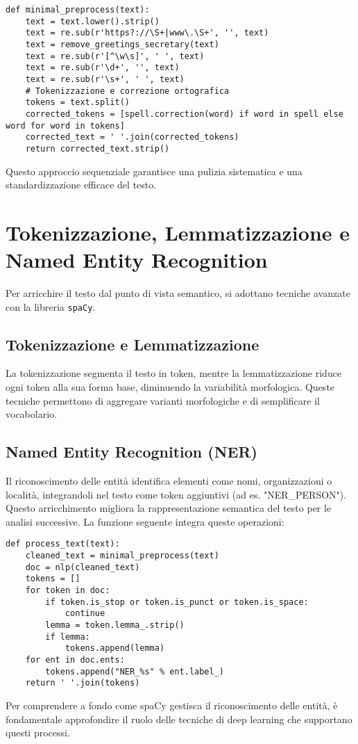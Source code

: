 \begin{lstlisting}[caption={Funzione minimal\_preprocess}]
def minimal_preprocess(text):
    text = text.lower().strip()
    text = re.sub(r'https?://\S+|www\.\S+', '', text)
    text = remove_greetings_secretary(text)
    text = re.sub(r'[^\w\s]', ' ', text)
    text = re.sub(r'\d+', '', text)
    text = re.sub(r'\s+', ' ', text)
    # Tokenizzazione e correzione ortografica
    tokens = text.split()
    corrected_tokens = [spell.correction(word) if word in spell else word for word in tokens]
    corrected_text = ' '.join(corrected_tokens)
    return corrected_text.strip()
\end{lstlisting}

Questo approccio sequenziale garantisce una pulizia sistematica e una standardizzazione efficace del testo.

\section{Tokenizzazione, Lemmatizzazione e Named Entity Recognition}
Per arricchire il testo dal punto di vista semantico, si adottano tecniche avanzate con la libreria \texttt{spaCy}.

\subsection{Tokenizzazione e Lemmatizzazione}
La tokenizzazione segmenta il testo in token, mentre la lemmatizzazione riduce ogni token alla sua forma base, diminuendo la variabilità morfologica. Queste tecniche permettono di aggregare varianti morfologiche e di semplificare il vocabolario.

\subsection{Named Entity Recognition (NER)}
Il riconoscimento delle entità identifica elementi come nomi, organizzazioni o località, integrandoli nel testo come token aggiuntivi (ad es. "NER\_PERSON"). Questo arricchimento migliora la rappresentazione semantica del testo per le analisi successive. La funzione seguente integra queste operazioni:

\begin{lstlisting}[caption={Funzione process\_text}]
def process_text(text):
    cleaned_text = minimal_preprocess(text)
    doc = nlp(cleaned_text)
    tokens = []
    for token in doc:
        if token.is_stop or token.is_punct or token.is_space:
            continue
        lemma = token.lemma_.strip()
        if lemma:
            tokens.append(lemma)
    for ent in doc.ents:
        tokens.append("NER_%s" % ent.label_)
    return ' '.join(tokens)
\end{lstlisting}
Per comprendere a fondo come spaCy gestisca il riconoscimento delle entità, è fondamentale approfondire il ruolo delle tecniche di deep learning che supportano questi processi.

